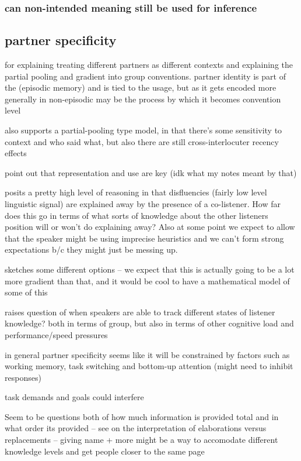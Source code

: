 \documentclass[]{article}
\begin{document}
\subsubsection{can non-intended meaning still be used for inference}

\subsection{partner specificity}

\cite{hawkins2021} for explaining treating different partners as different contexts and explaining the partial pooling and gradient into group conventions. partner identity is part of the (episodic memory) and is tied to the usage, but as it gets encoded more generally in non-episodic may be the process by which it becomes convention level 

\cite{yoon2014} also supports a partial-pooling type model, in that there's some sensitivity to context and who said what, but also there are still cross-interlocuter recency effects

\cite{yoon2014} point out that representation and use are key (idk what my notes meant by that) 

\cite{yoon2014} posits a pretty high level of reasoning in that disfluencies (fairly low level linguistic signal) are explained away by the presence of a co-listener. How far does this go in terms of what sorts of knowledge about the other listeners position will or won't do explaining away? Also at some point we expect to allow that the speaker might be using imprecise heuristics and we can't form strong expectations b/c they might just be messing up. 

\cite{yoon2018} sketches some different options -- we expect that this is actually going to be a lot more gradient than that, and it would be cool to have a mathematical model of some of this

\cite{yoon2018} raises question of when speakers are able to track different states of listener knowledge? both in terms of group, but also in terms of other cognitive load and performance/speed pressures 

in general partner specificity seems like it will be constrained by factors such as working memory, task switching and bottom-up attention (might need to inhibit responses) 

task demands and goals could interfere

Seem to be questions both of how much information is provided total and in what order its provided -- see \cite{yoon2018} on the interpretation of elaborations versus replacements -- giving name + more might be a way to accomodate different knowledge levels and get people closer to the same page 
\end{document}
